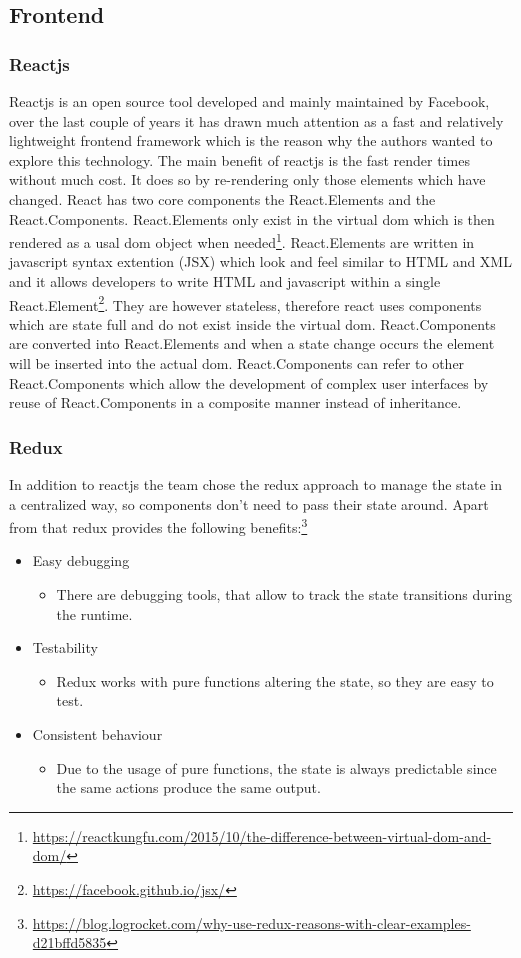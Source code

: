 \subsection{Frontend}
\subsubsection{Reactjs}
Reactjs is an open source tool developed and mainly maintained by Facebook, over the last couple of years it has drawn much attention as a fast and relatively lightweight frontend framework which is the reason why the authors wanted to explore this technology. The main benefit of reactjs  is the fast render times without much cost. It does so by re-rendering only those elements which have changed. React has two core components the React.Elements and the React.Components. React.Elements only exist in the virtual dom which is then rendered as a usal dom object when needed\footnote{\url{https://reactkungfu.com/2015/10/the-difference-between-virtual-dom-and-dom/}}. React.Elements are written in javascript syntax extention (JSX) which look and feel similar to HTML and XML and it allows developers to write HTML and javascript within a single React.Element\footnote{\url{https://facebook.github.io/jsx/}}. They are however stateless, therefore react uses components which are state full and do not exist inside the virtual dom. React.Components are converted into React.Elements and when a state change occurs the element will be inserted into the actual dom. React.Components can refer to other React.Components which allow the development of complex user interfaces by reuse of React.Components in a composite manner instead of inheritance. 

\subsubsection{Redux}
In addition to reactjs the team chose the redux approach to manage the state in a centralized way, so components don’t need to pass their state around. Apart from that redux provides the following benefits:\footnote{\url{https://blog.logrocket.com/why-use-redux-reasons-with-clear-examples-d21bffd5835}}
\begin{itemize}
	\item Easy debugging
	\begin{itemize}
		\item There are debugging tools, that allow to track the state transitions during the runtime.
	\end{itemize}		
	\item Testability
	\begin{itemize}
		\item Redux works with pure functions altering the state, so they are easy to test.
	\end{itemize}
	\item Consistent behaviour
		\begin{itemize}
		\item Due to the usage of pure functions, the state is always predictable since the same actions produce the same output.
	\end{itemize}
\end{itemize}

